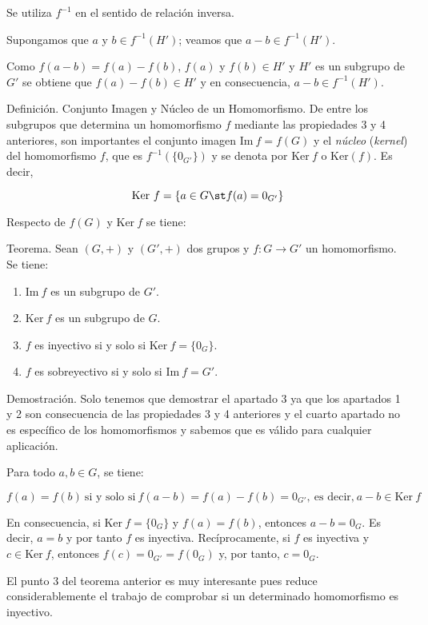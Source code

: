 Se utiliza $f^{-1}$ en el sentido de relación inversa.

Supongamos que $a$ y $b \in f^{-1}(H')$; veamos que $a - b \in f^{-1}(H')$.

Como $f(a - b) = f(a) - f(b)$, $f(a)$ y $f(b) \in H'$ y $H'$ es un subgrupo
de $G'$ se obtiene que $f(a) - f(b) \in H'$ y en consecuencia, $a - b \in
f^{-1}(H')$.

Definición. Conjunto Imagen y Núcleo de un Homomorfismo. De entre los
subgrupos que determina un homomorfismo $f$ mediante las propiedades 3 y 4
anteriores, son importantes el conjunto imagen $\text{Im}\ f = f(G)$ y el
\emph{núcleo} (\emph{kernel}) del homomorfismo $f$, que es
$f^{-1}(\{0_{G'}\})$ y se denota por $\text{Ker}\ f$ o $\text{Ker}(f)$. Es
decir,

$$ \text{Ker}\ f = \{ a \in G \st f(a) = 0_{G'} \} $$

Respecto de $f(G)$ y $\text{Ker}\ f$ se tiene:

Teorema. Sean $(G, +)$ y $(G', +)$ dos grupos y $f: G \longrightarrow G'$ un
homomorfismo. Se tiene:

\begin{enumerate}
  \item $\text{Im}\ f$ es un subgrupo de $G'$.
  \item $\text{Ker}\ f$ es un subgrupo de $G$.
  \item $f$ es inyectivo si y solo si $\text{Ker}\ f = \{0_G\}$.
  \item $f$ es sobreyectivo si y solo si $\text{Im}\ f = G'$.
\end{enumerate}

Demostración. Solo tenemos que demostrar el apartado 3 ya que los apartados
1 y 2 son consecuencia de las propiedades 3 y 4 anteriores y el cuarto
apartado no es específico de los homomorfismos y sabemos que es válido para
cualquier aplicación.

Para todo $a, b \in G$, se tiene:

$$ f(a) = f(b) \ \text{si y solo si}\ f(a - b) = f(a) - f(b) = 0_{G'}, \
\text{es decir,} \ a - b \in \text{Ker}\ f $$

En consecuencia, si $\text{Ker}\ f = \{0_G\}$ y $f(a) = f(b)$, entonces $a -
b = 0_G$. Es decir, $a = b$ y por tanto $f$ es inyectiva. Recíprocamente, si
$f$ es inyectiva y $c \in \text{Ker}\ f$, entonces $f(c) = 0_{G'} = f(0_G)$
y, por tanto, $c = 0_G$.

El punto 3 del teorema anterior es muy interesante pues reduce
considerablemente el trabajo de comprobar si un determinado homomorfismo es
inyectivo.


